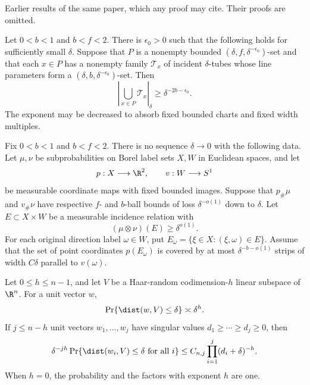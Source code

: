 Earlier results of the same paper, which any proof may cite. Their proofs are omitted.

\begin{theorem}
\label{ang:furstenberg}
Let $0<b<1$ and $b<f<2$. There is $\epsilon_0>0$ such that the
following holds for sufficiently small $\delta$. Suppose that $P$ is
a nonempty bounded $(\delta,f,\delta^{-\epsilon_0})$-set and that
each $x\in P$ has a nonempty family $\mathcal T_x$ of incident
$\delta$-tubes whose line parameters form a
$(\delta,b,\delta^{-\epsilon_0})$-set. Then
\[
 \left|\bigcup_{x\in P}\mathcal T_x\right|_\delta
       \ge\delta^{-2b-\epsilon_0}.
\]
The exponent may be decreased to absorb fixed bounded charts and fixed
width multiples.
\end{theorem}

\begin{lemma}
\label{ang:planar-measures}
Fix $0<b<1$ and $b<f<2$. There is no sequence $\delta\to0$ with the
following data. Let $\mu,\nu$ be subprobabilities on Borel label sets
$X,W$ in Euclidean spaces, and let
\[
 p:X\longrightarrow\R^2,\qquad v:W\longrightarrow S^1
\]
be measurable coordinate maps with fixed bounded images. Suppose that
$p_\#\mu$ and $v_\#\nu$ have respective $f$- and $b$-ball bounds
of loss $\delta^{-o(1)}$ down to $\delta$. Let $E\subset X\times W$ be a measurable
incidence relation with
\[
 (\mu\otimes\nu)(E)\ge\delta^{o(1)}.
\]
For each original direction label $\omega\in W$, put
$E_\omega=\{\xi\in X:(\xi,\omega)\in E\}$. Assume that the set of
point coordinates $p(E_\omega)$ is covered by at most
$\delta^{-b-o(1)}$ strips of width $C\delta$ parallel to $v(\omega)$.
\end{lemma}

\begin{lemma}\label{ang:haar}
Let $0\le h\le n-1$, and let $V$ be a Haar-random codimension-$h$
linear subspace of $\R^n$.
For a unit vector $w$,
\[
 \Pr\{\dist(w,V)\le\delta\}\asymp\delta^h.
\]
If $j\le n-h$ unit vectors $w_1,\ldots,w_j$ have singular values
$d_1\ge\cdots\ge d_j\ge0$, then
\begin{equation}\label{ang:haar-multiple}
 \delta^{-jh}\Pr\{\dist(w_i,V)\le\delta\text{ for all }i\}
       \le C_{n,j}\prod_{i=1}^j(d_i+\delta)^{-h}.
\end{equation}
When $h=0$, the probability and the factors with exponent $h$ are one.
\end{lemma}


